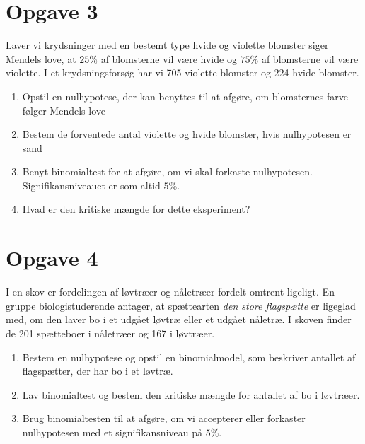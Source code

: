 \section*{Opgave 3}
Laver vi krydsninger med en bestemt type hvide og violette blomster siger Mendels love, at $25\%$ af blomsterne vil være hvide og $75\%$ af blomsterne vil være violette. I et krydsningsforsøg har vi 705 violette blomster og 224 hvide blomster. 
\begin{enumerate}[label=\roman*)]
\item Opstil en nulhypotese, der kan benyttes til at afgøre, om blomsternes farve følger Mendels love
\item Bestem de forventede antal violette og hvide blomster, hvis nulhypotesen er sand
\item Benyt binomialtest for at afgøre, om vi skal forkaste nulhypotesen. Signifikansniveauet er som altid $5\%$.
\item Hvad er den kritiske mængde for dette eksperiment?
\end{enumerate}

\section*{Opgave 4}
I en skov er fordelingen af løvtræer og nåletræer fordelt omtrent ligeligt. En gruppe biologistuderende antager, at spættearten \textit{den store flagspætte} er ligeglad med, om den laver bo i et udgået løvtræ eller et udgået nåletræ. I skoven finder de 201 spætteboer i nåletræer og 167 i løvtræer. 
\begin{enumerate}[label=\roman*)]
\item Bestem en nulhypotese og opstil en binomialmodel, som beskriver antallet af flagspætter, der har bo i et løvtræ.
\item Lav binomialtest og bestem den kritiske mængde for antallet af bo i løvtræer.
\item Brug binomialtesten til at afgøre, om vi accepterer eller forkaster nulhypotesen med et signifikansniveau på $5\%$.

\end{enumerate}


